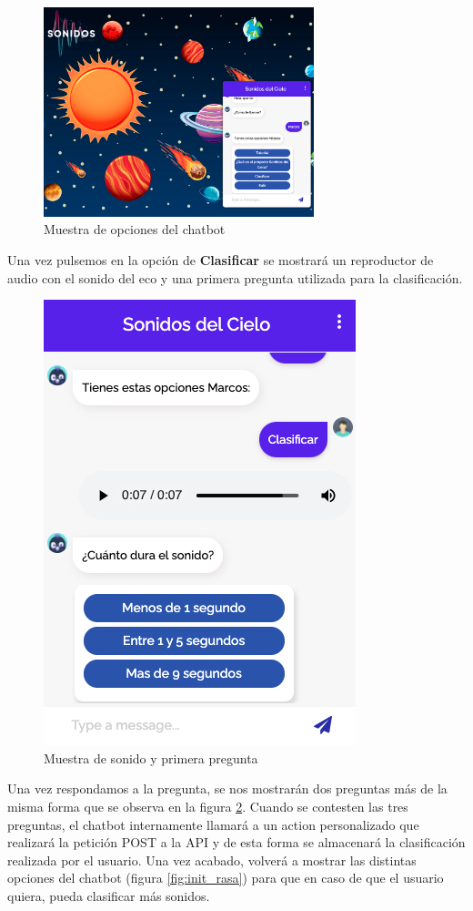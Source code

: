 \begin{figure}[H]
    \centering
    \includegraphics[width=0.7\textwidth]{include/resultados/RasaOptions.png}
    \caption{Muestra de opciones del chatbot}
    \label{fig:rasa_options}
\end{figure}

Una vez pulsemos en la opción de \textbf{Clasificar} se mostrará un reproductor de audio con el sonido del eco y una primera pregunta utilizada para la clasificación.

\begin{figure}[H]
    \centering
    \includegraphics[scale=0.6]{include/resultados/RasaPrimeraPregunta.png}
    \caption{Muestra de sonido y primera pregunta}
    \label{fig:primera_pregunta}
\end{figure}

Una vez respondamos a la pregunta, se nos mostrarán dos preguntas más de la misma forma que se observa en la figura \ref{fig:primera_pregunta}. Cuando se contesten las tres preguntas, el chatbot internamente llamará a un action personalizado que realizará la petición POST a la API y de esta forma se almacenará la clasificación realizada por el usuario. Una vez acabado, volverá a mostrar las distintas opciones del chatbot (figura \ref{fig:init_rasa}) para que en caso de que el usuario quiera, pueda clasificar más sonidos.